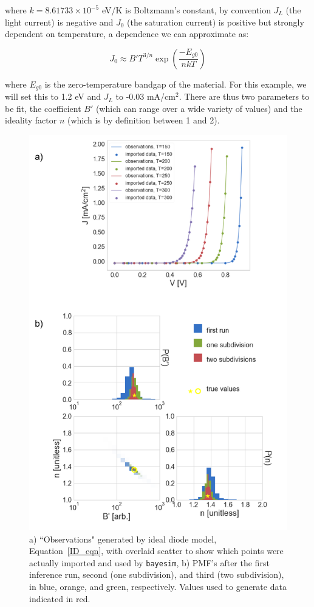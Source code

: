 \documentclass[aps,prl,amsmath,amssymb,superscriptaddress,notitlepage,groupedaddress]{revtex4-1}
\begin{document}
    where $k=8.61733\times 10^{-5}$ eV/K is Boltzmann's constant, by convention $J_L$ (the light current) is negative and $J_0$ (the saturation current) is positive but strongly dependent on temperature, a dependence we can approximate as:

    \begin{equation}
      J_0 \approx B'T^{3/n}\exp{\left(\frac{-E_{g0}}{nkT}\right)}
    \end{equation}

    where $E_{g0}$ is the zero-temperature bandgap of the material. For this example, we will set this to 1.2 eV and $J_L$ to -0.03 mA/cm$^2$. There are thus two parameters to be fit, the coefficient $B'$ (which can range over a wide variety of values) and the ideality factor $n$ (which is by definition between 1 and 2).


    \begin{figure}
      \includegraphics[width=0.8\columnwidth]{figure_3.png}
      \caption{a) ``Observations" generated by ideal diode model, Equation~\ref{ID_eqn}, with overlaid scatter to show which points were actually imported and used by \texttt{bayesim}, b) PMF's after the first inference run, second (one subdivision), and third (two subdivision), in blue, orange, and green, respectively. Values used to generate data indicated in red.}
      \label{ID_data}
    \end{figure}
\end{document}
